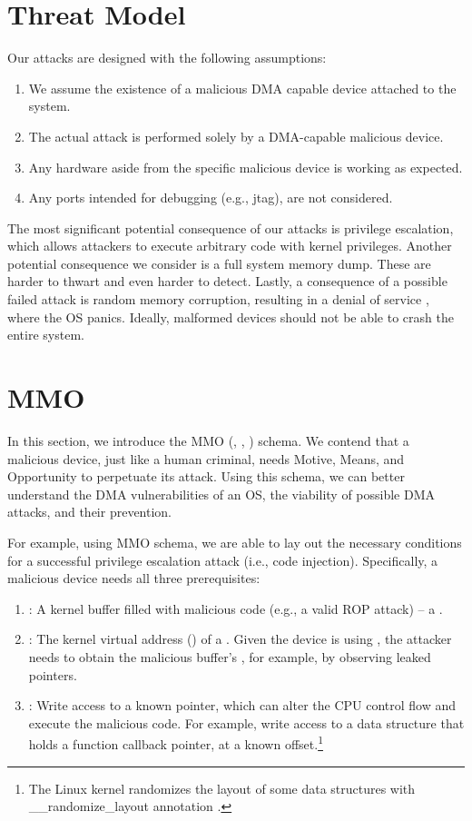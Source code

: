 

\section{Threat Model}\label{sec:threat_model}

Our attacks are designed with the following assumptions:
\begin{enumerate}
    \item We assume the existence of a malicious DMA capable device attached to the system.
    \item The actual attack is performed solely by a DMA-capable malicious device.
    \item Any hardware aside from the specific malicious device is working as expected.
    \item Any ports intended for debugging (e.g., jtag), are not considered.
 \end{enumerate}

The most significant potential consequence of our attacks is privilege escalation, which allows attackers to execute arbitrary code with kernel privileges. Another potential consequence we consider is a full system memory dump. These are harder to thwart and even harder to detect. Lastly, a consequence of a possible failed attack is random memory corruption, resulting in a denial of service \cite{MMT16}, where the OS panics. Ideally, malformed devices should not be able to crash the entire system. 

\section{MMO}\label{sec:mmo}

In this section, we introduce the MMO (\motivation, \means, \oportunity) schema. We contend that a malicious device, just like a human criminal, needs Motive, Means, and Opportunity to perpetuate its attack. Using this schema, we can better understand the DMA vulnerabilities of an OS, the viability of possible DMA attacks, and their prevention. 

For example, using MMO schema, we are able to lay out the necessary conditions for a successful privilege escalation attack (i.e., code injection). Specifically, a malicious device needs all three prerequisites:
\begin{enumerate}
    \item \motivation: A kernel buffer filled with malicious code (e.g., a valid ROP attack) -- a \mabaf.
    \item \means: The kernel virtual address (\kva) of a \mabaf. Given the device is using \iova, the attacker needs to obtain the malicious buffer's \kva{}, for example, by observing leaked pointers. 
    \item \oportunity: Write access to a known pointer, which can alter the CPU control flow and execute the malicious code. For example, write access to a data structure that holds a function callback pointer, at a known offset.\footnote{The Linux kernel randomizes the layout of some data structures with \_\_randomize\_layout annotation \cite{rand_layout}.}
\end{enumerate}

